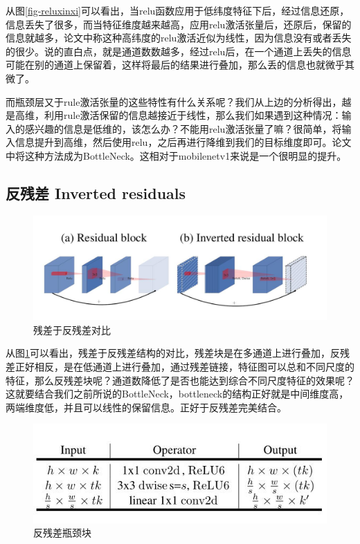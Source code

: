 \documentclass[UTF8,a4paper,12pt]{ctexart}
\begin{document}
从图\ref{fig-reluxinxi}可以看出，当relu函数应用于低纬度特征下后，经过信息还原，信息丢失了很多，而当特征维度越来越高，应用relu激活张量后，还原后，保留的信息就越多，论文中称这种高纬度的relu激活近似为线性，因为信息没有或者丢失的很少。说的直白点，就是通道数数越多，经过relu后，在一个通道上丢失的信息可能在别的通道上保留着，这样将最后的结果进行叠加，那么丢的信息也就微乎其微了。


而瓶颈层又于rule激活张量的这些特性有什么关系呢？我们从上边的分析得出，越是高维，利用rule激活保留的信息越接近于线性，那么我们如果遇到这种情况：输入的感兴趣的信息是低维的，该怎么办？不能用relu激活张量了嘛？很简单，将输入信息提升到高维，然后使用relu，之后再进行降维到我们的目标维度即可。论文中将这种方法成为BottleNeck。这相对于mobilenetv1来说是一个很明显的提升。

\subsection{反残差 Inverted residuals}


 \begin{figure}[htbp]
 	\centering
 	\includegraphics[width=\linewidth]{webmin/残差于反残差.jpg}
 	\caption{残差于反残差对比}
 	\label{fig-canchaduibi}
 \end{figure}
 
 从图\ref{fig-canchaduibi}可以看出，残差\cite{resnet,renet2}于反残差结构的对比，残差块是在多通道上进行叠加，反残差正好相反，是在低通道上进行叠加，通过残差链接，特征图可以总和不同尺度的特征，那么反残差块呢？通道数降低了是否也能达到综合不同尺度特征的效果呢？这就要结合我们之前所说的BottleNeck，bottleneck的结构正好就是中间维度高，两端维度低，并且可以线性的保留信息。正好于反残差完美结合。
 
 \begin{figure}[htbp]
	\centering
	\includegraphics[width=\linewidth]{webmin/反残差瓶颈块.jpg}
	\caption{反残差瓶颈块}
	\label{fig-fancanchapingjing}
\end{figure}
 
\end{document}
